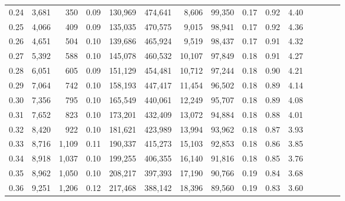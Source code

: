 \begin{tabular}{rrrcrrrrrrrrrrr}
0.24 &   3,681 &    350 &                                       0.09 &  130,969 &  474,641 &    8,606 &   99,350 &  0.17 &  0.92 &                         4.40 \\
0.25 &   4,066 &    409 &                                       0.09 &  135,035 &  470,575 &    9,015 &   98,941 &  0.17 &  0.92 &                         4.36 \\
0.26 &   4,651 &    504 &                                       0.10 &  139,686 &  465,924 &    9,519 &   98,437 &  0.17 &  0.91 &                         4.32 \\
0.27 &   5,392 &    588 &                                       0.10 &  145,078 &  460,532 &   10,107 &   97,849 &  0.18 &  0.91 &                         4.27 \\
0.28 &   6,051 &    605 &                                       0.09 &  151,129 &  454,481 &   10,712 &   97,244 &  0.18 &  0.90 &                         4.21 \\
0.29 &   7,064 &    742 &                                       0.10 &  158,193 &  447,417 &   11,454 &   96,502 &  0.18 &  0.89 &                         4.14 \\
0.30 &   7,356 &    795 &                                       0.10 &  165,549 &  440,061 &   12,249 &   95,707 &  0.18 &  0.89 &                         4.08 \\
0.31 &   7,652 &    823 &                                       0.10 &  173,201 &  432,409 &   13,072 &   94,884 &  0.18 &  0.88 &                         4.01 \\
0.32 &   8,420 &    922 &                                       0.10 &  181,621 &  423,989 &   13,994 &   93,962 &  0.18 &  0.87 &                         3.93 \\
0.33 &   8,716 &  1,109 &                                       0.11 &  190,337 &  415,273 &   15,103 &   92,853 &  0.18 &  0.86 &                         3.85 \\
0.34 &   8,918 &  1,037 &                                       0.10 &  199,255 &  406,355 &   16,140 &   91,816 &  0.18 &  0.85 &                         3.76 \\
0.35 &   8,962 &  1,050 &                                       0.10 &  208,217 &  397,393 &   17,190 &   90,766 &  0.19 &  0.84 &                         3.68 \\
0.36 &   9,251 &  1,206 &                                       0.12 &  217,468 &  388,142 &   18,396 &   89,560 &  0.19 &  0.83 &                         3.60 \\

\end{tabular}
